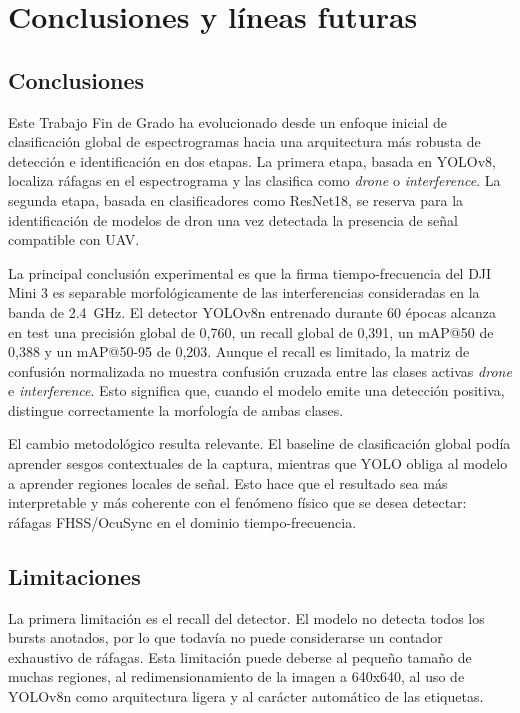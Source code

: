 \chapter{Conclusiones y líneas futuras}
\label{cap:conclusiones}

\section{Conclusiones}
\label{sec:conclusiones}

Este Trabajo Fin de Grado ha evolucionado desde un enfoque inicial de clasificación global de espectrogramas hacia una arquitectura más robusta de detección e identificación en dos etapas. La primera etapa, basada en YOLOv8, localiza ráfagas en el espectrograma y las clasifica como \emph{drone} o \emph{interference}. La segunda etapa, basada en clasificadores como ResNet18, se reserva para la identificación de modelos de dron una vez detectada la presencia de señal compatible con UAV.

La principal conclusión experimental es que la firma tiempo-frecuencia del DJI Mini 3 es separable morfológicamente de las interferencias consideradas en la banda de \SI{2.4}{\giga\hertz}. El detector YOLOv8n entrenado durante 60 épocas alcanza en test una precisión global de 0,760, un recall global de 0,391, un mAP@50 de 0,388 y un mAP@50-95 de 0,203. Aunque el recall es limitado, la matriz de confusión normalizada no muestra confusión cruzada entre las clases activas \emph{drone} e \emph{interference}. Esto significa que, cuando el modelo emite una detección positiva, distingue correctamente la morfología de ambas clases.

El cambio metodológico resulta relevante. El baseline de clasificación global podía aprender sesgos contextuales de la captura, mientras que YOLO obliga al modelo a aprender regiones locales de señal. Esto hace que el resultado sea más interpretable y más coherente con el fenómeno físico que se desea detectar: ráfagas FHSS/OcuSync en el dominio tiempo-frecuencia.

\section{Limitaciones}
\label{sec:limitaciones}

La primera limitación es el recall del detector. El modelo no detecta todos los bursts anotados, por lo que todavía no puede considerarse un contador exhaustivo de ráfagas. Esta limitación puede deberse al pequeño tamaño de muchas regiones, al redimensionamiento de la imagen a \num{640}x\num{640}, al uso de YOLOv8n como arquitectura ligera y al carácter automático de las etiquetas.


